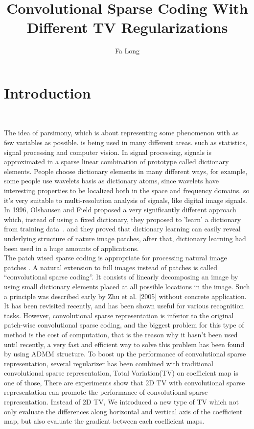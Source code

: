 \documentclass[a4paper,11pt]{article}
\title{Convolutional Sparse Coding With Different TV Regularizations }
\author{Fa Long}
\begin{document}
\maketitle

\section{Introduction}~

The idea of parsimony, which is about representing some phenomenon with as few variables as possible. is being used in many different areas. such as statistics, signal processing and computer vision. In signal processing, signals is approximated  in a sparse linear combination of prototype called dictionary elements. People choose dictionary elements in many different ways, for example, some people use wavelets basis as dictionary atoms, since wavelets have interesting properties to be localized both in the space and frequency domains. so it's very suitable to multi-resolution analysis of signals, like digital image signals.\\

In 1996, Olshausen and Field proposed a very significantly different approach which, instead of using a fixed dictionary,  they proposed to 'learn' a dictionary from training data~\cite{DBLP:journals/corr/MairalBP14}. and they proved that dictionary learning can easily reveal underlying structure of nature image patches, after that, dictionary learning had been used in a huge amounts of applications.\\

The patch wised sparse coding is appropriate for processing natural image patches \cite{4011956}\cite{1640847}. A natural extension to full images instead of patches is called “convolutional sparse coding”. It consists of linearly decomposing an image by using small dictionary elements placed at all possible locations in the image. Such a principle was described early by Zhu et al. [2005] without concrete application. It has been revisited recently, and has been shown useful for various recognition tasks\cite{DBLP:journals/corr/MairalBP14}. However, convolutional sparse representation is inferior to the original patch-wise convolutional sparse coding, and the biggest problem for this type of method is the cost of computation, that is the reason why it hasn't been used until recently, a very fast and efficient way to solve this problem has been found by using ADMM structure\cite{7308045}. To boost up the performance of convolutional sparse representation, several regularizer has been combined with traditional convolutional sparse representation, Total Variation(TV) on coefficient map is one of those, There are experiments show that 2D TV with convolutional sparse representation can promote the performance of convolutional sparse representation. Instead of 2D TV, We introduced a new type of TV which not only evaluate the differences along horizontal and vertical axis of the coefficient map, but also evaluate the gradient between each coefficient maps.
\\
\end{document}
